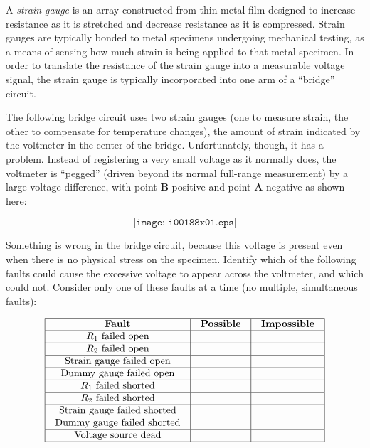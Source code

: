 

A {\it strain gauge} is an array constructed from thin metal film designed to increase resistance as it is stretched and decrease resistance as it is compressed.  Strain gauges are typically bonded to metal specimens undergoing mechanical testing, as a means of sensing how much strain is being applied to that metal specimen.  In order to translate the resistance of the strain gauge into a measurable voltage signal, the strain gauge is typically incorporated into one arm of a ``bridge'' circuit.

\vskip 10pt

The following bridge circuit uses two strain gauges (one to measure strain, the other to compensate for temperature changes), the amount of strain indicated by the voltmeter in the center of the bridge.  Unfortunately, though, it has a problem.  Instead of registering a very small voltage as it normally does, the voltmeter is ``pegged'' (driven beyond its normal full-range measurement) by a large voltage difference, with point {\bf B} positive and point {\bf A} negative as shown here:

$$\texttt{[image: i00188x01.eps]}$$

\goodbreak
Something is wrong in the bridge circuit, because this voltage is present even when there is no physical stress on the specimen.  Identify which of the following faults could cause the excessive voltage to appear across the voltmeter, and which could not.  Consider only one of these faults at a time (no multiple, simultaneous faults):


$$\vbox{\offinterlineskip
\halign{\strut
\vrule \quad\hfil # \ \hfil & 
\vrule \quad\hfil # \ \hfil & 
\vrule \quad\hfil # \ \hfil \vrule \cr
\noalign{\hrule}
%
{\bf Fault} & {\bf Possible} & {\bf Impossible} \cr
%
\noalign{\hrule}
%
$R_1$ failed open &  &  \cr
%
\noalign{\hrule}
%
$R_2$ failed open &  &  \cr
%
\noalign{\hrule}
%
Strain gauge failed open &  &  \cr
%
\noalign{\hrule}
%
Dummy gauge failed open &  &  \cr
%
\noalign{\hrule}
%
$R_1$ failed shorted &  &  \cr
%
\noalign{\hrule}
%
$R_2$ failed shorted &  &  \cr
%
\noalign{\hrule}
%
Strain gauge failed shorted &  &  \cr
%
\noalign{\hrule}
%
Dummy gauge failed shorted &  &  \cr
%
\noalign{\hrule}
%
Voltage source dead &  &  \cr
%
\noalign{\hrule}
} %
}$$ %

